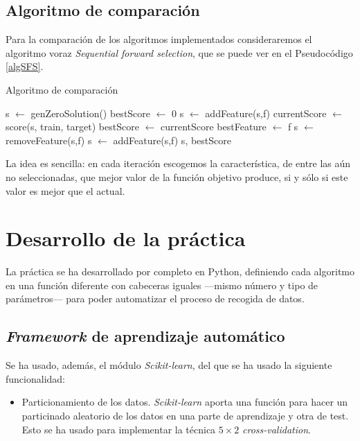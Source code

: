 \documentclass[a4paper, 11pt, titlepage]{article}
\begin{document}
    \subsection{Algoritmo de comparación}

    Para la comparación de los algoritmos implementados consideraremos el algoritmo voraz \emph{Sequential forward selection}, que se puede ver en el Pseudocódigo \ref{algSFS}.

    \begin{algorithm}
        \caption{Algoritmo de comparación}\label{algSFS}
        \begin{algorithmic}[1]
            \State s $\gets$ genZeroSolution()
            \State bestScore $\gets$ 0
                    \State s $\gets$ addFeature(s,f)
                    \State currentScore $\gets$ score(s, train, target)
                    \State bestScore $\gets$ currentScore
                    \State bestFeature $\gets$ f
                    \EndIf
                    \State s $\gets$ removeFeature(s,f)
                \EndFor
            \State s $\gets$ addFeature(s,f)
            \EndIf
            \EndWhile
            \State \Return s, bestScore
            \EndFunction
        \end{algorithmic}
    \end{algorithm}

    La idea es sencilla: en cada iteración escogemos la característica, de entre las aún no seleccionadas, que mejor valor de la función objetivo produce, si y sólo si este valor es mejor que el actual.

    \section{Desarrollo de la práctica}

    La práctica se ha desarrollado por completo en Python, definiendo cada algoritmo en una función diferente con cabeceras iguales ---mismo número y tipo de parámetros--- para poder automatizar el proceso de recogida de datos.

    \subsection{\emph{Framework} de aprendizaje automático}
    Se ha usado, además, el módulo \emph{Scikit-learn}, del que se ha usado la siguiente funcionalidad:
    \begin{itemize}
        \item Particionamiento de los datos. \emph{Scikit-learn} aporta una función para hacer un particinado aleatorio de los datos en una parte de aprendizaje y otra de test. Esto se ha usado para implementar la técnica $5\times2$ \emph{cross-validation}.
    \end{itemize}
\end{document}
